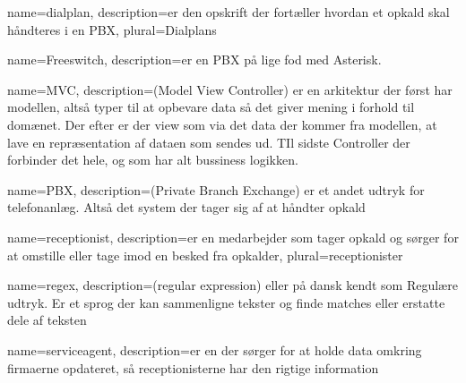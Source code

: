 {
  name=dialplan,
  description={er den opskrift der fortæller hvordan et opkald skal håndteres i en \gls{PBX}},
  plural=Dialplans
}

{
  name=Freeswitch,
  description={er en \gls{PBX} på lige fod med Asterisk.}
}

{
  name=MVC,
  description={(Model View Controller) er en arkitektur der først har modellen, altså typer til at opbevare data så det giver mening i forhold til domænet. Der efter er der view som via det data der kommer fra modellen, at lave en repræsentation af dataen som sendes ud. TIl sidste Controller der forbinder det hele, og som har alt bussiness logikken.}
}

{
  name=PBX,
  description={(Private Branch Exchange) er et andet udtryk for telefonanlæg. Altså det system der tager sig af at håndter opkald}
}

{
  name=receptionist,
  description={er en medarbejder som tager opkald og sørger for at omstille eller tage imod en besked fra opkalder},
  plural=receptionister
}

{
  name=regex,
  description={(regular expression) eller på dansk kendt som Regulære udtryk. Er et sprog der kan sammenligne tekster og finde matches eller erstatte dele af teksten}
}

{
  name=serviceagent,
  description={er en der sørger for at holde data omkring firmaerne opdateret, så \gls{receptionist}erne har den rigtige information}
}
